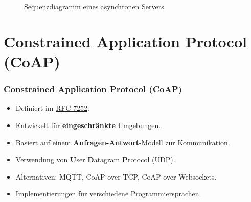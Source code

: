 \documentclass[11pt,t,usepdftitle=false,aspectratio=169,usenames,dvipsnames]{beamer}
\begin{document}
\begin{frame}
\begin{figure}[ht]
            \caption{Sequenzdiagramm eines asynchronen Servers}
            \label{figure:sequence-diagram-of-asynchronous-server}
        \end{figure}
    \end{frame}

    \section{Constrained Application Protocol (CoAP)}
    \begin{frame}
        \frametitle{Constrained Application Protocol (CoAP)}
        \begin{itemize}
            \item<1-> Definiert im \href{https://tools.ietf.org/html/rfc7252}{RFC 7252}.
            \item<2-> Entwickelt für \textcolor{uibkblue}{\textbf{eingeschränkte}} Umgebungen.
            \item<3-> Basiert auf einem \textcolor{uibkblue}{\textbf{Anfragen-Antwort}}-Modell zur Kommunikation.
            \item<4-> Verwendung von \textcolor{uibkblue}{\textbf{U}}ser \textcolor{uibkblue}{\textbf{D}}atagram \textcolor{uibkblue}{\textbf{P}}rotocol (UDP).
            \item<5-> Alternativen: MQTT, CoAP over TCP, CoAP over Websockets.
            \item<6-> Implementierungen für verschiedene Programmiersprachen.
        \end{itemize}
    \end{frame}
\end{document}
